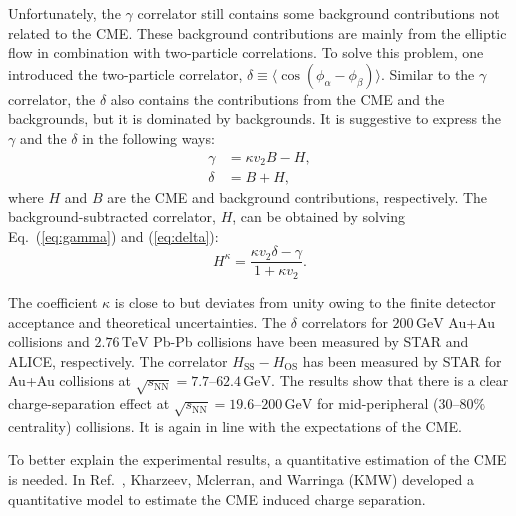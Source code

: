 \documentclass[preprint]{elsarticle}
\begin{document}
Unfortunately, the $\gamma$ correlator still contains some background contributions not related to the CME\cite{Schlichting:2010qia,Pratt:2010zn,Bzdak:2012ia}. These background contributions are mainly from the elliptic flow in combination with two-particle correlations. To solve this problem, one introduced the two-particle correlator, $\delta \equiv \langle \cos(\phi_\alpha - \phi_\beta) \rangle$. Similar to the $\gamma$ correlator, the $\delta$ also contains the contributions from the CME and the backgrounds, but it is dominated by backgrounds. It is suggestive to express the $\gamma$ and the $\delta$ in the following ways\cite{Bzdak:2012ia, Liao:2015Pr}:
\begin{align}
\gamma &= \kappa v_2 B - H, \label{eq:gamma} \\
\delta &= B + H, \label{eq:delta}
\end{align}
where $H$ and $B$ are the CME and background contributions, respectively. The background-subtracted correlator, $H$, can be obtained by solving Eq.~(\ref{eq:gamma}) and (\ref{eq:delta}):
\begin{equation}
H^\kappa = \frac{\kappa v_2 \delta - \gamma}{1 + \kappa v_2}.
\end{equation}

The coefficient $\kappa$ is close to but deviates from unity owing to the finite detector acceptance and theoretical uncertainties\cite{Bzdak:2012ia}. The $\delta$ correlators for $200\,\mathrm{GeV}$ Au+Au collisions and $2.76\,\mathrm{TeV}$ Pb-Pb collisions have been measured by STAR\cite{Abelev:2009ad} and ALICE\cite{PhysRevLett.110.012301}, respectively. The correlator $H_\text{SS} - H_\text{OS}$ has been measured by STAR for Au+Au collisions at $\sqrt{s_\text{NN}} = 7.7$--$62.4\,\mathrm{GeV}$\cite{Adamczyk:2014mzf}. The results show that there is a clear charge-separation effect at $\sqrt{s_\text{NN}} = 19.6$--$200\,\mathrm{GeV}$ for mid-peripheral ($30$--$80\%$ centrality) collisions. It is again in line with the expectations of the CME.


To better explain the experimental results, a quantitative estimation of the CME is needed.
In Ref.~\cite{Kharzeev:2007jp}, Kharzeev, Mclerran, and Warringa (KMW) developed a quantitative model to estimate the CME induced charge separation.
\end{document}

